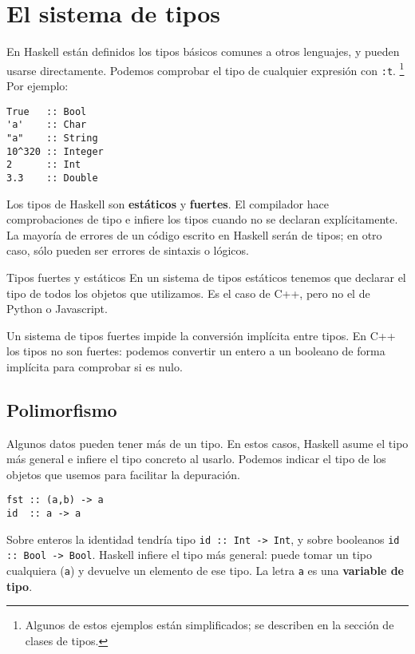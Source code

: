 \section {El sistema de tipos}

En Haskell están definidos los tipos básicos comunes a otros lenguajes,
y pueden usarse directamente.
Podemos comprobar el tipo de cualquier expresión con \texttt{:t}. \footnote{
Algunos de estos ejemplos están simplificados; se describen en la sección de
clases de tipos.} Por ejemplo:

\begin{lstlisting}
True   :: Bool
'a'    :: Char
"a"    :: String
10^320 :: Integer
2      :: Int
3.3    :: Double
\end{lstlisting}

Los tipos de Haskell son \textbf{estáticos} y \textbf{fuertes}.
El compilador hace comprobaciones de tipo e infiere los tipos cuando no se
declaran explícitamente. La mayoría de errores de un código escrito en Haskell
serán de tipos; en otro caso, sólo pueden ser errores de sintaxis o lógicos.

\begin{otro}{Tipos fuertes y estáticos}
En un sistema de tipos estáticos tenemos que declarar el tipo de todos los objetos
que utilizamos. Es el caso de C++, pero no el de Python o Javascript.

\espacio

Un sistema de tipos fuertes impide la conversión implícita entre tipos. En C++
los tipos no son fuertes: podemos convertir un entero a un booleano
de forma implícita para comprobar si es nulo.
\end{otro}


\subsection{Polimorfismo}

Algunos datos pueden tener más de un tipo. En estos casos, Haskell asume
el tipo más general e infiere el tipo concreto al usarlo.
Podemos indicar el tipo de los objetos que usemos para
facilitar la depuración.

\begin{lstlisting}
fst :: (a,b) -> a
id  :: a -> a
\end{lstlisting}

Sobre enteros la identidad tendría tipo \texttt{id :: Int -> Int}, y sobre
booleanos \texttt{id :: Bool -> Bool}. Haskell infiere el tipo más general: puede
tomar un tipo cualquiera (\texttt{a}) y devuelve un elemento de ese tipo. La letra
\texttt{a} es una \textbf{variable de tipo}.

